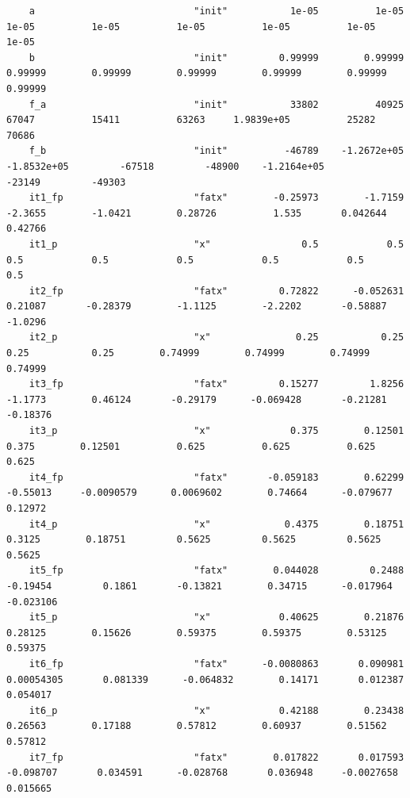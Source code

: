 \documentclass[
]{book}
\begin{document}
\begin{verbatim}
    a                            "init"           1e-05          1e-05          1e-05          1e-05          1e-05          1e-05          1e-05          1e-05
    b                            "init"         0.99999        0.99999        0.99999        0.99999        0.99999        0.99999        0.99999        0.99999
    f_a                          "init"           33802          40925          67047          15411          63263     1.9839e+05          25282          70686
    f_b                          "init"          -46789    -1.2672e+05    -1.8532e+05         -67518         -48900    -1.2164e+05         -23149         -49303
    it1_fp                       "fatx"        -0.25973        -1.7159        -2.3655        -1.0421        0.28726          1.535       0.042644        0.42766
    it1_p                        "x"                0.5            0.5            0.5            0.5            0.5            0.5            0.5            0.5
    it2_fp                       "fatx"         0.72822      -0.052631        0.21087       -0.28379        -1.1125        -2.2202       -0.58887        -1.0296
    it2_p                        "x"               0.25           0.25           0.25           0.25        0.74999        0.74999        0.74999        0.74999
    it3_fp                       "fatx"         0.15277         1.8256        -1.1773        0.46124       -0.29179      -0.069428       -0.21281       -0.18376
    it3_p                        "x"              0.375        0.12501          0.375        0.12501          0.625          0.625          0.625          0.625
    it4_fp                       "fatx"       -0.059183        0.62299       -0.55013     -0.0090579      0.0069602        0.74664      -0.079677        0.12972
    it4_p                        "x"             0.4375        0.18751         0.3125        0.18751         0.5625         0.5625         0.5625         0.5625
    it5_fp                       "fatx"        0.044028         0.2488       -0.19454         0.1861       -0.13821        0.34715      -0.017964      -0.023106
    it5_p                        "x"            0.40625        0.21876        0.28125        0.15626        0.59375        0.59375        0.53125        0.59375
    it6_fp                       "fatx"      -0.0080863       0.090981     0.00054305       0.081339      -0.064832        0.14171       0.012387       0.054017
    it6_p                        "x"            0.42188        0.23438        0.26563        0.17188        0.57812        0.60937        0.51562        0.57812
    it7_fp                       "fatx"        0.017822       0.017593      -0.098707       0.034591      -0.028768       0.036948     -0.0027658       0.015665

\end{verbatim}
\end{document}
